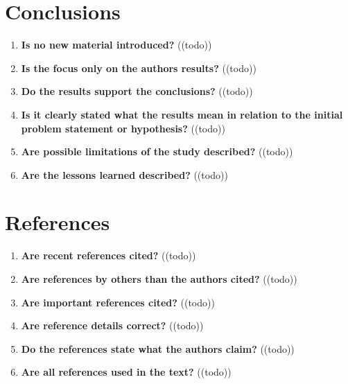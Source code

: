 \section{Conclusions}\label{sec:conclusions}
\begin{enumerate}[resume]
    \item \textbf{Is no new material introduced?} 	\textcolor{HighlightColor}{((todo))}
    \item \textbf{Is the focus only on the authors results?} 	\textcolor{HighlightColor}{((todo))}
    \item \textbf{Do the results support the conclusions?} 	\textcolor{HighlightColor}{((todo))}
    \item \textbf{Is it clearly stated what the results mean in relation to the initial problem statement or hypothesis?} 	\textcolor{HighlightColor}{((todo))}
    \item \textbf{Are possible limitations of the study described?} 	\textcolor{HighlightColor}{((todo))}
    \item \textbf{Are the lessons learned described?} 	\textcolor{HighlightColor}{((todo))}
\end{enumerate}

\section{References}\label{sec:references}
\begin{enumerate}[resume]
    \item \textbf{Are recent references cited?} 	\textcolor{HighlightColor}{((todo))}
    \item \textbf{Are references by others than the authors cited?} 	\textcolor{HighlightColor}{((todo))}
    \item \textbf{Are important references cited?} 	\textcolor{HighlightColor}{((todo))}
    \item \textbf{Are reference details correct?} 	\textcolor{HighlightColor}{((todo))}
    \item \textbf{Do the references state what the authors claim?} 	\textcolor{HighlightColor}{((todo))}
    \item \textbf{Are all references used in the text?} 	\textcolor{HighlightColor}{((todo))}
\end{enumerate}

